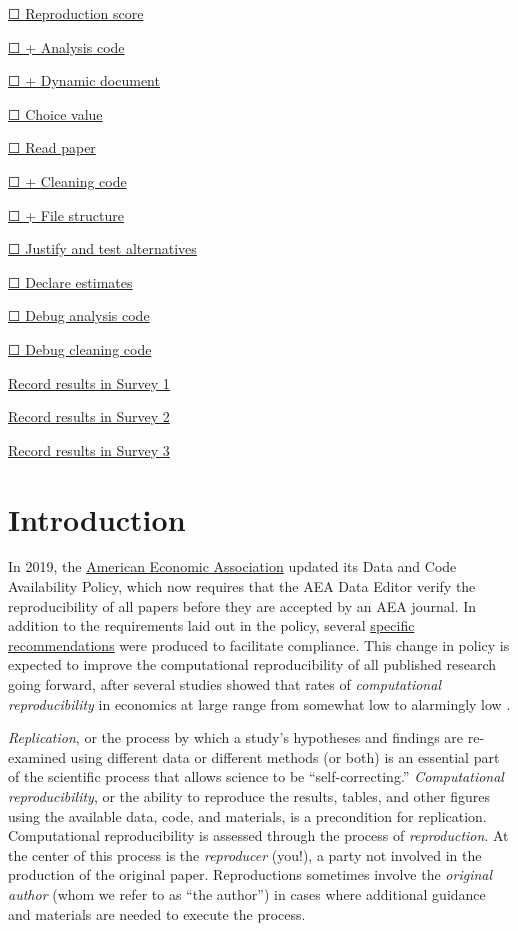 \documentclass[]{book}
\begin{document}
\protect\hyperlink{score}{☐ Reproduction score}

\protect\hyperlink{ac}{☐ + Analysis code}

\protect\hyperlink{paper-level}{☐ + Dynamic document}

\protect\hyperlink{id-val}{☐ Choice value}

\protect\hyperlink{read-summ}{☐ Read paper}

\protect\hyperlink{cc}{☐ + Cleaning code}

\protect\hyperlink{paper-level}{☐ + File structure}

\protect\hyperlink{test-rob}{☐ Justify and test alternatives}

\protect\hyperlink{declare-estimates}{☐ Declare estimates}

\protect\hyperlink{dac}{☐ Debug analysis code}

\protect\hyperlink{dcc}{☐ Debug cleaning code}

\href{https://berkeley.qualtrics.com/jfe/form/SV_2bO83uJvU9ZiTXv}{Record results in Survey 1}

\href{https://berkeley.qualtrics.com/jfe/form/SV_2gd9Y3XVtjLpZL7}{Record results in Survey 2}

\href{ADD\%20LINK}{Record results in Survey 3}

\hypertarget{intro}{%
\chapter*{Introduction}\label{intro}}

In 2019, the \href{https://www.aeaweb.org/journals/policies/data-code/}{American Economic Association} updated its Data and Code Availability Policy, which now requires that the AEA Data Editor verify the reproducibility of all papers before they are accepted by an AEA journal. In addition to the requirements laid out in the policy, several \href{https://aeadataeditor.github.io/aea-de-guidance/}{specific recommendations} were produced to facilitate compliance. This change in policy is expected to improve the computational reproducibility of all published research going forward, after several studies showed that rates of \emph{computational reproducibility} in economics at large range from somewhat low to alarmingly low \citep{galiani2018make, chang2015economics, kingi2018reproducibility}.

\emph{Replication}, or the process by which a study's hypotheses and findings are re-examined using different data or different methods (or both) \citep{King95} is an essential part of the scientific process that allows science to be ``self-correcting.'' \emph{Computational reproducibility}, or the ability to reproduce the results, tables, and other figures using the available data, code, and materials, is a precondition for replication. Computational reproducibility is assessed through the process of \emph{reproduction}. At the center of this process is the \emph{reproducer} (you!), a party not involved in the production of the original paper. Reproductions sometimes involve the \emph{original author} (whom we refer to as ``the author'') in cases where additional guidance and materials are needed to execute the process.
\end{document}
